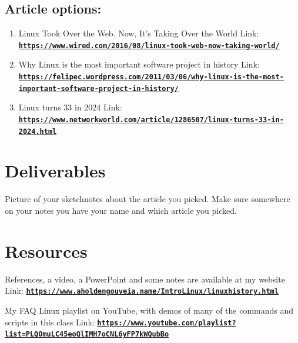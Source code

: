 \documentclass[12pt]{article}
\begin{document}
\subsection*{Article options:}
    \begin{enumerate}
        \item Linux Took Over the Web. Now, It's Taking Over the World Link: \href{https://www.wired.com/2016/08/linux-took-web-now-taking-world/}{\textbf{\nolinkurl{https://www.wired.com/2016/08/linux-took-web-now-taking-world/}}}
        \item Why Linux is the most important software project in history Link: \href{https://felipec.wordpress.com/2011/03/06/why-linux-is-the-most-important-software-project-in-history/}{\textbf{\nolinkurl{https://felipec.wordpress.com/2011/03/06/why-linux-is-the-most-important-software-project-in-history/}}}
        \item Linux turns 33 in 2024 Link: \href{https://www.networkworld.com/article/1286507/linux-turns-33-in-2024.html}{\textbf{\nolinkurl{https://www.networkworld.com/article/1286507/linux-turns-33-in-2024.html}}}

    \end{enumerate}


\section*{Deliverables}
Picture of your sketchnotes about the article you picked. Make sure somewhere on your notes you have your name and which article you picked. 
\section*{Resources}
References, a video, a PowerPoint and some notes are available at my website
Link: \href{https://www.aholdengouveia.name/IntroLinux/linuxhistory.html}{\textbf{\nolinkurl{https://www.aholdengouveia.name/IntroLinux/linuxhistory.html}}}

My FAQ Linux playlist on YouTube, with demos of many of the commands and scripts in this class
Link: \href{https://www.youtube.com/playlist?list=PLQOmuLC45eoQlIMH7oCNL6yFP7kWQubBo}{\textbf{\nolinkurl{https://www.youtube.com/playlist?list=PLQOmuLC45eoQlIMH7oCNL6yFP7kWQubBo}}}
\end{document}

